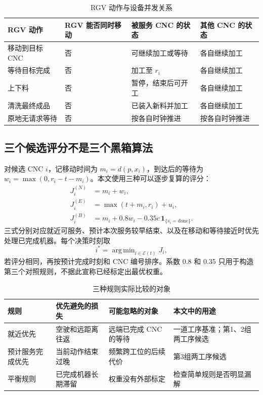 \documentclass[UTF8,11pt,a4paper]{ctexart}
\newcommand{\argmin}{\mathop{\mathrm{arg\,min}}}
\begin{document}
\begin{table}[H]
\centering
\caption{RGV 动作与设备并发关系}
\label{tab:concurrency-b}
\small
\begin{tabularx}{\textwidth}{p{3.5cm}p{3.5cm}p{3.8cm}X}
\toprule
RGV 动作 & RGV 能否同时移动 & 被服务 CNC 的状态 & 其他 CNC 的状态\\
\midrule
移动到目标 CNC & 否 & 可继续加工或等待 & 各自继续加工\\
等待目标完成 & 否 & 加工至 $r_i$ & 各自继续加工\\
上下料 & 否 & 暂停，结束后可开工 & 各自继续加工\\
清洗最终成品 & 否 & 已装入新料并加工 & 各自继续加工\\
原地无请求等待 & 否 & 按各自时钟推进 & 按各自时钟推进\\
\bottomrule
\end{tabularx}
\end{table}

\subsection{三个候选评分不是三个黑箱算法}

对候选 CNC $i$，记移动时间为 $m_i=d(p,x_i)$，到达后的等待为 $w_i=\max(0,r_i-t-m_i)$。本文使用三种可以逐步复算的评分：
\begin{align}
J_i^{(N)}&=m_i+w_i,\label{eq:nearest-score-b}\\
J_i^{(E)}&=\max(t+m_i,r_i)+u_i,\label{eq:earliest-score-b}\\
J_i^{(B)}&=m_i+0.8w_i-0.35c\,\mathbf 1_{\{s_i=\mathrm{done}\}}.
\label{eq:balanced-score-b}
\end{align}
三式分别对应就近可服务、预计本次服务较早结束、以及在移动和等待接近时优先处理已完成机器。每个决策时刻取
\begin{equation}
i^*=\argmin_{i\in\mathcal E(t)}J_i,
\label{eq:dispatch-choice-b}
\end{equation}
若评分相同，再按预计完成时刻和 CNC 编号排序。系数 0.8 和 0.35 只用于构造第三个对照规则，不据此宣称已经标定出最优权重。

\begin{table}[H]
\centering
\caption{三种规则实际比较的对象}
\label{tab:policy-meaning-b}
\small
\begin{tabularx}{\textwidth}{p{3.0cm}p{4.1cm}p{4.1cm}X}
\toprule
规则 & 优先避免的损失 & 可能忽略的对象 & 本文中的用途\\
\midrule
就近优先 & 空驶和远距离往返 & 远端已完成 CNC 的等待 & 一道工序基准；第1、2组两工序候选\\
预计服务完成优先 & 当前动作结束过晚 & 频繁跨工位的后续代价 & 第3组两工序候选\\
平衡规则 & 已完成机器长期滞留 & 权重没有外部标定 & 检查简单规则是否明显漏解\\
\bottomrule
\end{tabularx}
\end{table}
\end{document}
